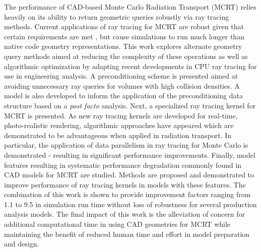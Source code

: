


The performance of CAD-based Monte Carlo Radiation Transport (MCRT) relies
heavily on its ability to return geometric queries robustly via ray
tracing methods. Current applications of ray tracing for MCRT are robust given that certain
requirements are met \cite{Smith_2011}, but cause simulations to run much longer
than native code geometry representations. This work explores alternate geometry
query methods aimed at reducing the complexity of these operations as well as
algorithmic optimization by adapting recent developments in CPU ray
tracing for use in engineering analysis. A preconditioning scheme is presented
aimed at avoiding unnecessary ray queries for volumes with high collision
densities. A model is also developed to inform the application of the
preconditioning data structure based on a \textit{post facto} analysis. Next, a
specialized ray tracing kernel for MCRT is presented. As new ray tracing kernels
are developed for real-time, photo-realistic rendering, algorithmic approaches
have appeared which are demonstrated to be advantageous when applied in radiation transport. In
particular, the application of data parallelism in ray tracing for Monte Carlo
is demonstrated - resulting in significant performance improvements. Finally,
model features resulting in systematic performance degradation commonly found in
CAD models for MCRT are studied. Methods are proposed and demonstrated to
improve performance of ray tracing kernels in models with these features. The combination
of this work is shown to provide improvement factors ranging from 1.1 to 9.5 in simulation run time
without loss of robustness for several production analysis models. The final impact
of this work is the alleviation of concern for additional computational time in
using CAD geometries for MCRT while maintaining the benefit of reduced human
time and effort in model preparation and design.
